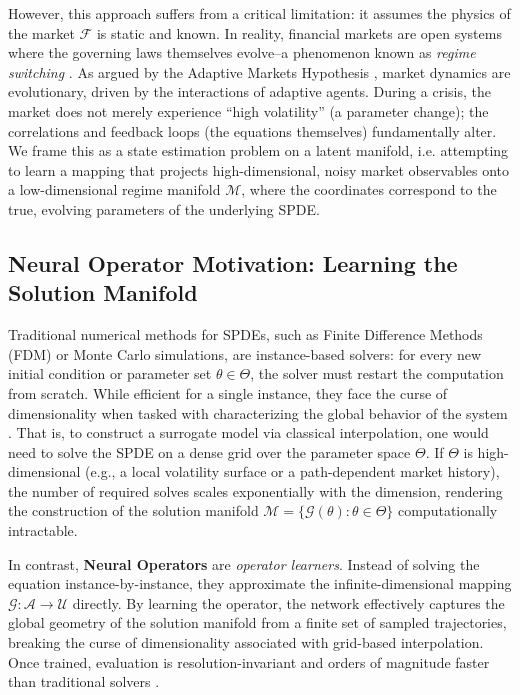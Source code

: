 \documentclass{article}
\begin{document}
However, this approach suffers from a critical limitation: it assumes the physics of the market \(\mathcal{F}\) is static and known. In reality, financial markets are open systems where the governing laws themselves evolve--a phenomenon known as \emph{regime switching} \citep{hamilton1989}. As argued by the Adaptive Markets Hypothesis \citep{lo2004adaptive}, market dynamics are evolutionary, driven by the interactions of adaptive agents. During a crisis, the market does not merely experience ``high volatility'' (a parameter change); the correlations and feedback loops (the equations themselves) fundamentally alter. We frame this as a state estimation problem on a latent manifold, i.e. attempting to learn a mapping that projects high-dimensional, noisy market observables onto a low-dimensional regime manifold \(\mathcal{M}\), where the coordinates correspond to the true, evolving parameters of the underlying SPDE.

\subsection{Neural Operator Motivation: Learning the Solution Manifold}
Traditional numerical methods for SPDEs, such as Finite Difference Methods (FDM) or Monte Carlo simulations, are instance-based solvers: for every new initial condition or parameter set \(\theta \in \Theta\), the solver must restart the computation from scratch. While efficient for a single instance, they face the curse of dimensionality when tasked with characterizing the global behavior of the system \citep{Bellman1957}. That is, to construct a surrogate model via classical interpolation, one would need to solve the SPDE on a dense grid over the parameter space \(\Theta\). If \(\Theta\) is high-dimensional (e.g., a local volatility surface or a path-dependent market history), the number of required solves scales exponentially with the dimension, rendering the construction of the solution manifold \(\mathcal{M} = \{ \mathcal{G}(\theta) : \theta \in \Theta \}\) computationally intractable.

In contrast, \textbf{Neural Operators} \citep{Lu_2021, kovachki2021neuraloperator} are \emph{operator learners}. Instead of solving the equation instance-by-instance, they approximate the infinite-dimensional mapping \(\mathcal{G}: \mathcal{A} \to \mathcal{U}\) directly. By learning the operator, the network effectively captures the global geometry of the solution manifold from a finite set of sampled trajectories, breaking the curse of dimensionality associated with grid-based interpolation. Once trained, evaluation is resolution-invariant and orders of magnitude faster than traditional solvers \citep{karniadakis2021physics}.
\end{document}
